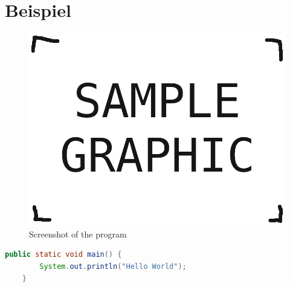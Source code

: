 \chapter{Beispiel} \label{sec:beispiel}


\begin{figure}[h]
	\includegraphics[width=\textwidth]{./grafiken/sample_graphic.png}
	\vskip0pt
	\caption{Screenshot of the program} \label{fig:samplefigure}
\end{figure}

\begin{lstlisting}[language=Java]
	public static void main() {
		System.out.println("Hello World");
	}
\end{lstlisting}



